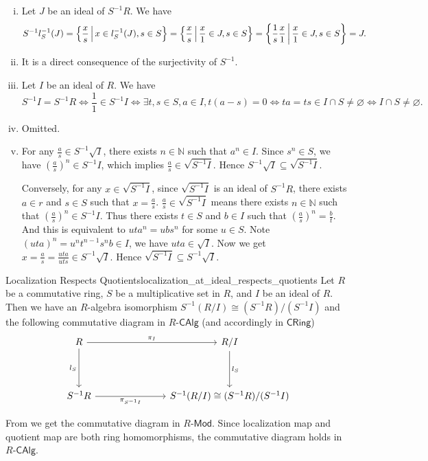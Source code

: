 \begin{prf}
    \begin{enumerate}[(i)]
        \item Let $J$ be an ideal of $S^{-1}R$. We have
        \[
            S^{-1}l_S^{-1}(J)=\left\{\frac{x}{s}\,\middle\vert\, x\in l_S^{-1}(J),s\in S\right\}=\left\{\frac{x}{s}\,\middle\vert\, \frac{x}{1}\in J,s\in S\right\}=\left\{\frac{1}{s}\frac{x}{1}\,\middle\vert\, \frac{x}{1}\in J,s\in S\right\}=J.
        \]
        \item It is a direct consequence of the surjectivity of $S^{-1}$.
        \item Let $I$ be an ideal of $R$. We have
        \[
            S^{-1}I=S^{-1}R\iff \frac{1}{1} \in S^{-1}I \iff \exists t,s\in S,a\in I, t(a-s)=0\iff ta=ts\in I\cap S\ne\varnothing \iff I\cap S\ne\varnothing.
        \]
        \item Omitted.
        \item For any $\frac{a}{s} \in S^{-1}\sqrt{I}$, there exists $n \in \mathbb{N}$ such that $a^n \in I$. Since $s^n \in S$, we have $\left(\frac{a}{s}\right)^n \in S^{-1}I$, which implies $\frac{a}{s} \in \sqrt{S^{-1}I}$. Hence $S^{-1}\sqrt{I} \subseteq \sqrt{S^{-1}I}$.

        Conversely, for any $x \in \sqrt{S^{-1}I}$, since $\sqrt{S^{-1}I}$ is an ideal of $S^{-1}R$, there exists $a\in r$ and $s\in S$ such that $x=\frac{a}{s}$. $\frac{a}{s}\in \sqrt{S^{-1}I}$ means there exists $n \in \mathbb{N}$ such that $\left(\frac{a}{s}\right)^n \in S^{-1}I$. Thus there exists $t \in S$ and $b\in I$ such that $\left(\frac{a}{s}\right)^n =\frac{b}{t}$. And this is equivalent to $uta^n =ubs^n$ for some $u\in S$. Note $(uta)^n=u^nt^{n-1}s^nb\in I$, we have $uta\in\sqrt{I}$. Now we get $x=\frac{a}{s} =\frac{uta}{uts}\in S^{-1}\sqrt{I}$. Hence $\sqrt{S^{-1}I} \subseteq S^{-1}\sqrt{I}$.
    \end{enumerate}
\end{prf}


\begin{proposition}{Localization Respects Quotients}{localization_at_ideal_respects_quotients}
    Let $R$ be a commutative ring, $S$ be a multiplicative set in $R$, and $I$ be an ideal of $R$. Then we have an $R$-algebra isomorphism $S^{-1}(R/I)\cong (S^{-1}R)/(S^{-1}I)$ and the following commutative diagram in $R\text{-}\mathsf{CAlg}$ (and accordingly in $\mathsf{CRing}$)
    \[
        \begin{tikzcd}
            R \arrow[r, "\pi_I"] \arrow[d, "l_S"'] &[+5em] R/I \arrow[d, "l_S"]              \\[+2em]
            S^{-1}R \arrow[r, "\pi_{S^{-1}I}"']       & S^{-1}(R/I)\cong (S^{-1}R)/(S^{-1}I)
            \end{tikzcd}
    \]
\end{proposition}
\begin{prf}
    From  we get the commutative diagram in $R\text{-}\mathsf{Mod}$. Since localization map and quotient map are both ring homomorphisms, the commutative diagram holds in $R\text{-}\mathsf{CAlg}$.
\end{prf}




